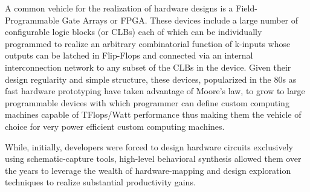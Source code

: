 A common vehicle for the realization of hardware designs is a Field-Programmable Gate Arrays or FPGA. These devices include a large number of configurable logic blocks (or CLBs)
each of which can be individually programmed to realize an arbitrary combinatorial function of k-inputs  whose outputs can be latched in Flip-Flops and connected via an internal interconnection network to any subset of the CLBs in the device.  Given their  design regularity and simple structure, these devices, popularized in the 80s as fast hardware prototyping have taken advantage of Moore's law, to grow to large programmable devices with which programmer can define custom computing machines capable of TFlops/Watt performance thus making them the vehicle of choice for very power efficient custom computing machines. 

While, initially, developers were forced to design hardware circuits exclusively using schematic-capture tools, high-level behavioral synthesis allowed them over the years to leverage the wealth of hardware-mapping and design exploration techniques to realize substantial productivity gains.  

